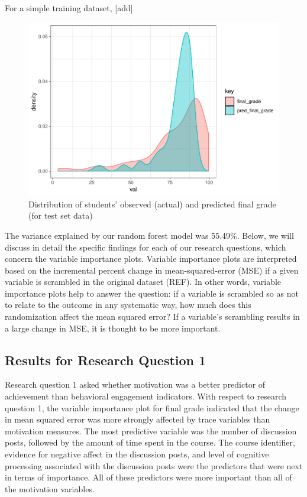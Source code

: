 \documentclass[acmart]{apa6}
\theoremstyle{definition}
\theoremstyle{definition}
\theoremstyle{definition}
\theoremstyle{remark}
\begin{document}
For a simple training dataset, {[}add{]}

\begin{figure}
\centering
\includegraphics{LAK_Manuscript_files/figure-latex/unnamed-chunk-3-1.pdf}
\caption{\label{fig:unnamed-chunk-3}Distribution of students' observed
(actual) and predicted final grade (for test set data)}
\end{figure}

The variance explained by our random forest model was 55.49\%. Below, we
will discuss in detail the specific findings for each of our research
questions, which concern the variable importance plots. Variable
importance plots are interpreted based on the incremental percent change
in mean-squared-error (MSE) if a given variable is scrambled in the
original dataset (REF). In other words, variable importance plots help
to answer the question: if a variable is scrambled so as not to relate
to the outcome in any systematic way, how much does this randomization
affect the mean squared error? If a variable's scrambling results in a
large change in MSE, it is thought to be more important.

\subsection{Results for Research Question
1}\label{results-for-research-question-1}

Research question 1 asked whether motivation was a better predictor of
achievement than behavioral engagement indicators. With respect to
research question 1, the variable importance plot for final grade
indicated that the change in mean squared error was more strongly
affected by trace variables than motivation measures. The most
predictive variable was the number of discussion posts, followed by the
amount of time spent in the course. The course identifier, evidence for
negative affect in the discussion posts, and level of cognitive
processing associated with the discussion posts were the predictors that
were next in terms of importance. All of these predictors were more
important than all of the motivation variables.
\end{document}
